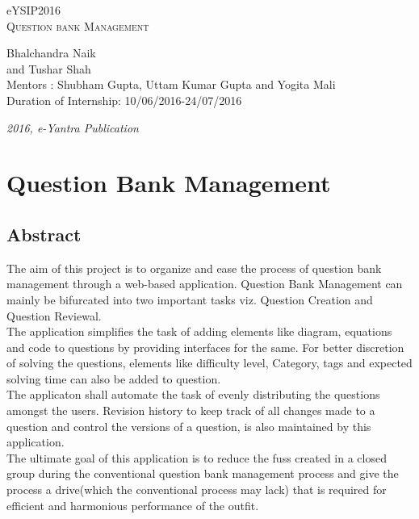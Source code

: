 \documentclass[a4paper,12pt,oneside]{book}
\begin{document}
\begin{titlepage}
\raggedright
{\Large eYSIP2016\\[1cm]}
{\Huge\scshape Question bank Management \\[.1in]}
\vfill
\begin{flushright}
{\large Bhalchandra Naik \\}
{\large and Tushar Shah \\}
{\large Mentors : Shubham Gupta, Uttam Kumar Gupta and Yogita Mali \\}
{\large Duration of Internship:  10/06/2016-24/07/2016  \\}
\end{flushright}

{\itshape 2016, e-Yantra Publication}
\end{titlepage}

\chapter[Project Tag]{Question Bank Management}
\section*{Abstract}

\hspace{0.6cm} The aim of this project is to organize and ease the process of question bank management through a web-based application. Question Bank Management can mainly be bifurcated into two important tasks viz. Question Creation and Question Reviewal.  \\

The application simplifies the task of adding elements like diagram, equations and code to questions by providing interfaces for the same. For better discretion of solving the questions, elements like difficulty level, Category, tags and expected solving time can also be added to question.	\\

The applicaton shall automate the task of evenly distributing the questions amongst the users.	Revision history to keep track of all changes made to a question and control the versions of a question, is also maintained by this application.	\\

The ultimate goal of this application is to reduce the fuss created in a closed group during the conventional question bank management process and give the process a drive(which the conventional process may lack) that is required for efficient and harmonious performance of the outfit. \\
\end{document}
